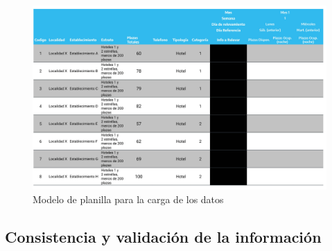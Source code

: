 \documentclass[
]{book}
\begin{document}
\begin{figure}

{\centering \includegraphics[width=1\linewidth]{imagenes/tabla_6a} 

}

\caption{Modelo de planilla para la carga de los datos}\label{fig:tabla-6a}
\end{figure}

\hypertarget{consistencia-y-validaciuxf3n-de-la-informaciuxf3n}{%
\subsection{Consistencia y validación de la información}\label{consistencia-y-validaciuxf3n-de-la-informaciuxf3n}}
\end{document}
